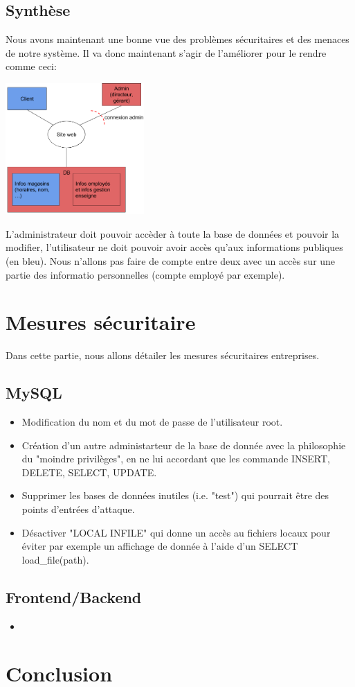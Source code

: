 \documentclass[a4paper]{article}
\begin{document}
\subsection{Synthèse}
Nous avons maintenant une bonne vue des problèmes sécuritaires et des menaces de notre système. Il va donc maintenant s'agir de l'améliorer pour le rendre comme ceci:\\
\begin{center}
 \includegraphics[width=200px]{img/systeme.png}
\end{center}

L'administrateur doit pouvoir accèder à toute la base de données et pouvoir la modifier, l'utilisateur ne doit pouvoir avoir accès qu'aux informations publiques (en bleu). Nous n'allons pas faire de compte entre deux avec un accès sur une partie des informatio  personnelles (compte employé par exemple).


\section{Mesures sécuritaire}
Dans cette partie, nous allons détailer les mesures sécuritaires entreprises.
\subsection{MySQL}
\begin{itemize}
\item Modification du nom et du mot de passe de l'utilisateur root.
\item Création d'un autre administarteur de la base de donnée avec la philosophie du "moindre privilèges", en ne lui accordant que les commande INSERT, DELETE, SELECT, UPDATE.
\item Supprimer les bases de données inutiles (i.e. "test") qui pourrait être des points d'entrées d'attaque.
\item Désactiver "LOCAL INFILE" qui donne un accès au fichiers locaux pour éviter par exemple un affichage de donnée à l'aide d'un SELECT load_file(path).
\end{itemize}

\subsection{Frontend/Backend}
\begin{itemize}
\item 
\end{itemize}
\section{Conclusion}
\end{document}
